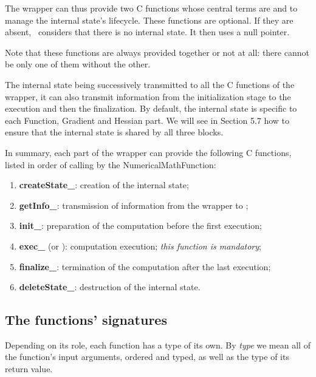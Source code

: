 The wrapper can thus provide two C functions whose central terms are  and  to manage the internal state's lifecycle. These functions are optional. If they are absent, \OT\ considers that there is no internal state. It then uses a null pointer.

Note that these functions are always provided together or not at all: there cannot be only one of them without the other.

The internal state being successively transmitted to all the C functions of the wrapper, it can also transmit information from the initialization stage to the execution and then the finalization. By default, the internal state is specific to each Function, Gradient and Hessian part. We will see in Section 5.7 how to ensure that the internal state is shared by all three blocks.

In summary, each part of the wrapper can provide the following C functions, listed in order of calling by the NumericalMathFunction:
\begin{enumerate}
\item {\bf createState\_}: creation of the internal state;
\item {\bf getInfo\_}: transmission of information from the wrapper to \OT ;
\item {\bf init\_}: preparation of the computation before the first execution;
\item {\bf exec\_} (or ): computation execution; \emph{this function is mandatory};
\item {\bf finalize\_}: termination of the computation after the last execution;
\item {\bf deleteState\_}: destruction of the internal state.
\end{enumerate}

\subsection{The functions' signatures}

Depending on its role, each function has a type of its own. By \emph{type} we mean all of the function's input arguments, ordered and typed, as well as the type of its return value.

